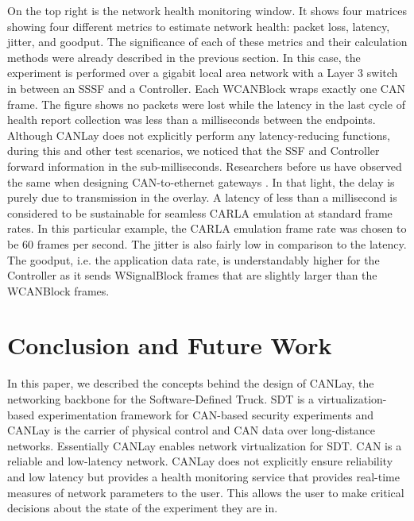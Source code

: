 \documentclass[letterpaper,twocolumn,12pt]{article}
\begin{document}
On the top right is the network health monitoring window. It shows four matrices showing
four different metrics to estimate network health: packet loss, latency, jitter, and goodput. The significance of each of these metrics and their calculation methods were already described in the previous section. In this case, the experiment is performed over a gigabit local area network with a Layer 3 switch in between an SSSF and a Controller. Each WCANBlock wraps exactly one CAN frame. The figure shows no packets were lost while the latency in the last cycle of health report collection was less than a milliseconds between the endpoints. 
Although CANLay does not explicitly perform any latency-reducing functions, during this and other test scenarios, we noticed that the SSF and Controller forward information in the sub-milliseconds. Researchers before us have observed the same when designing CAN-to-ethernet gateways \cite{florian_polzlbauer_experience_2019}. In that light, the delay is purely due to transmission in the overlay. 
A latency of less than a millisecond is considered to be sustainable for seamless CARLA emulation at standard frame rates. 
In this particular example, the CARLA emulation frame rate was chosen to be 60 frames per second. The jitter is also fairly low in comparison to the latency. The goodput, i.e. the application data rate, is understandably higher for the Controller as it sends WSignalBlock frames that are slightly larger than the WCANBlock frames. 


\section{Conclusion and Future Work}
In this paper, we described the concepts behind the design of CANLay, the networking backbone for the Software-Defined Truck. 
SDT is a virtualization-based experimentation framework for CAN-based security experiments and CANLay is the carrier of physical control and CAN data over long-distance networks. Essentially CANLay enables network virtualization for SDT. CAN is a reliable and low-latency network. CANLay does not explicitly ensure reliability and low latency but provides a health monitoring service that provides real-time measures of network parameters to the user. This allows the user to make critical decisions about the state of the experiment they are in.
\end{document}
